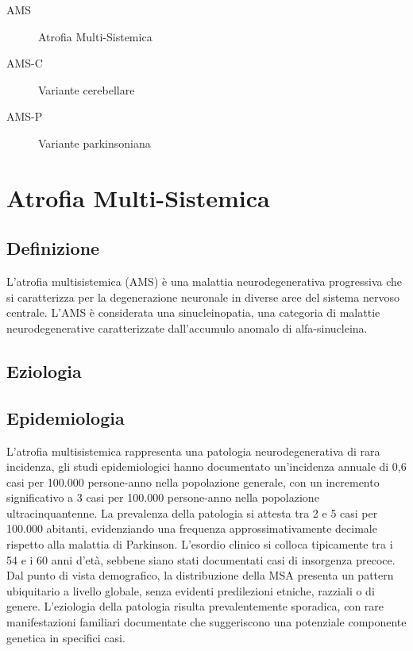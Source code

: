 \begin{description}
	\item[AMS]{Atrofia Multi-Sistemica}
	\item[AMS-C] Variante cerebellare
	\item[AMS-P] Variante parkinsoniana
\end{description}

\section{Atrofia Multi-Sistemica}

\subsection{Definizione}
L'atrofia multisistemica (AMS) è una malattia neurodegenerativa progressiva che si caratterizza per la degenerazione neuronale in diverse aree del sistema nervoso centrale. L'AMS è considerata una sinucleinopatia, una categoria di malattie neurodegenerative caratterizzate dall'accumulo anomalo di alfa-sinucleina.

\subsection{Eziologia}

\subsection{Epidemiologia}
L'atrofia multisistemica rappresenta una patologia neurodegenerativa di rara incidenza, gli studi epidemiologici hanno documentato un'incidenza annuale di 0,6 casi per 100.000 persone-anno nella popolazione generale, con un incremento significativo a 3 casi per 100.000 persone-anno nella popolazione ultracinquantenne. La prevalenza della patologia si attesta tra 2 e 5 casi per 100.000 abitanti, evidenziando una frequenza approssimativamente decimale rispetto alla malattia di Parkinson. L'esordio clinico si colloca tipicamente tra i 54 e i 60 anni d'età, sebbene siano stati documentati casi di insorgenza precoce. Dal punto di vista demografico, la distribuzione della MSA presenta un pattern ubiquitario a livello globale, senza evidenti predilezioni etniche, razziali o di genere. L'eziologia della patologia risulta prevalentemente sporadica, con rare manifestazioni familiari documentate che suggeriscono una potenziale componente genetica in specifici casi.

